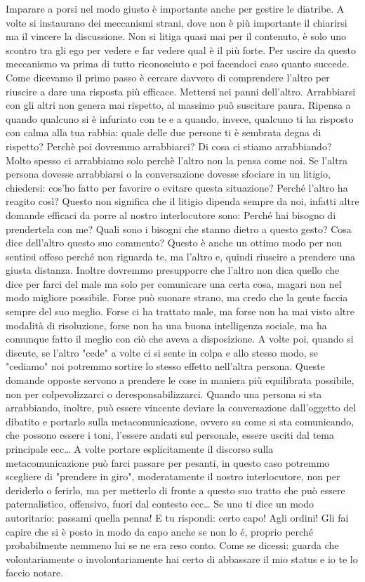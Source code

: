 \documentclass[12pt]{book} %
\begin{document}
\bigskip

Imparare a porsi nel modo giusto è importante anche per gestire le diatribe. A volte si instaurano dei meccanismi
strani, dove non è più importante il chiarirsi ma il vincere la discussione. 
Non si litiga quasi mai per il contenuto, è solo uno scontro tra gli ego per vedere e far vedere qual è il più forte. 
Per uscire da questo meccanismo va prima di tutto riconosciuto e poi facendoci caso quanto
succede. Come dicevamo il primo passo è cercare davvero di comprendere l'altro per riuscire a dare
una risposta più efficace. Mettersi nei panni dell'altro. 
Arrabbiarsi con gli altri non genera mai rispetto, al massimo può suscitare paura. Ripensa a quando qualcuno si è infuriato con te e a quando, invece, qualcuno ti ha risposto con calma alla tua rabbia: quale delle due persone ti è sembrata degna di rispetto? 
Perchè poi dovremmo arrabbiarci? Di cosa ci stiamo arrabbiando? Molto spesso ci arrabbiamo solo perchè l'altro non la pensa come noi.
Se l'altra persona dovesse arrabbiarsi o la conversazione dovesse sfociare in un litigio, chiedersi: cos'ho fatto per favorire o evitare questa
situazione? Perché l'altro ha reagito così? 
Questo non significa che il litigio dipenda sempre da noi, infatti altre domande efficaci da porre al nostro interlocutore sono:
Perché hai bisogno di prendertela con me? Quali sono i bisogni che stanno dietro a questo gesto?
Cosa dice dell'altro questo suo commento?
Questo è anche un ottimo modo per non sentirsi offeso perché non riguarda te, ma l'altro e, quindi riuscire a prendere una giusta distanza.
Inoltre dovremmo presupporre che l'altro non dica quello che dice per farci del male ma solo per comunicare una certa cosa, magari non nel modo migliore possibile. 
Forse può suonare strano, ma credo che la gente faccia sempre del suo meglio. Forse ci ha trattato male, ma forse non ha mai visto altre modalità di risoluzione, forse non ha una buona intelligenza sociale, ma ha comunque fatto il meglio con ciò che aveva a disposizione.
A volte poi, quando si discute, se l'altro "cede" a volte ci si sente in colpa e allo stesso modo, se "cediamo" noi potremmo sortire lo stesso effetto nell'altra persona.
Queste domande opposte servono a prendere le cose in maniera più equilibrata possibile, non per colpevolizzarci o deresponsabilizzarci.
Quando una persona si sta arrabbiando, inoltre, può essere vincente deviare la conversazione dall'oggetto del dibatito e portarlo sulla metacomunicazione, ovvero su come si sta comunicando, che possono essere i toni, l'essere andati sul personale, essere usciti dal tema principale ecc… 
A volte portare esplicitamente il discorso sulla metacomunicazione può farci passare per pesanti, in questo caso potremmo scegliere di "prendere in giro", moderatamente il nostro interlocutore, non per deriderlo o ferirlo, ma per metterlo di fronte a questo suo tratto che può essere paternalistico, offensivo, fuori dal contesto ecc… Se uno ti dice un modo autoritario: passami quella penna! E tu rispondi: certo capo! Agli ordini! Gli fai capire che si è posto in modo da capo anche se non lo é, proprio perché probabilmente nemmeno lui se ne era reso conto. Come se dicessi: guarda che volontariamente o involontariamente hai certo di abbassare il mio status e io te lo faccio notare.
\end{document}
